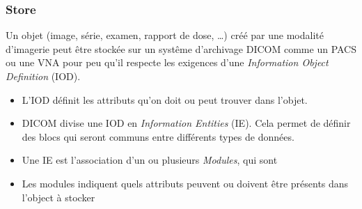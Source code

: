 	\frame
	{
		\frametitle{Store}
		Un objet (image, s\'erie, examen, rapport de dose, \ldots) cr\'e\'e par une modalit\'e d'imagerie peut \^etre stock\'ee sur un syst\^eme d'archivage DICOM comme un PACS ou une VNA pour peu qu'il respecte les exigences d'une \emph{Information Object Definition} (IOD).
		\begin{itemize}
			\item<2-> L'IOD d\'efinit les attributs qu'on doit ou peut trouver dans l'objet.
			\item<3-> DICOM divise une IOD en \emph{Information Entities} (IE). Cela permet de d\'efinir des blocs qui seront communs entre diff\'erents types de donn\'ees.
			\item<4-> Une IE est l'association d'un ou plusieurs \emph{Modules}, qui sont
	   		\item<8-> Les modules indiquent quels attributs peuvent ou doivent \^etre pr\'esents dans l'object \`a stocker
		\end{itemize}
	}
	


